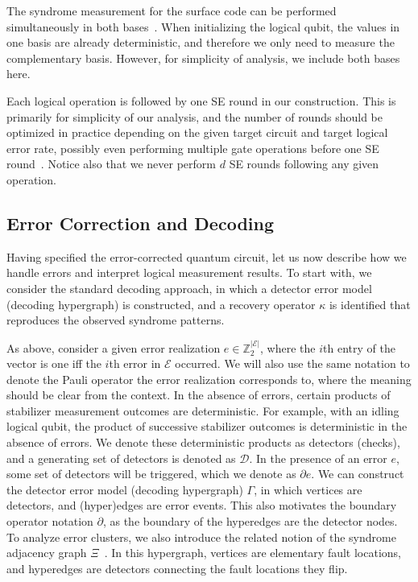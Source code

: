 The syndrome measurement for the surface code can be performed simultaneously in both bases~\cite{fowler2012surface}.
%
When initializing the logical qubit, the values in one basis are already deterministic, and therefore we only need to measure the complementary basis.
%
However, for simplicity of analysis, we include both bases here.

Each logical operation is followed by one SE round in our construction.
%
This is primarily for simplicity of our analysis, and the number of rounds should be optimized in practice depending on the given target circuit and target logical error rate, possibly even performing multiple gate operations before one SE round~\cite{cain2024correlated}.
%
Notice also that we never perform $d$ SE rounds following any given operation.

\subsection{Error Correction and Decoding}
\label{si:decoding}
Having specified the error-corrected quantum circuit, let us now describe how we handle errors and interpret logical measurement results.
%
To start with, we consider the standard decoding approach, in which a detector error model (decoding hypergraph) is constructed, and a recovery operator $\kappa$ is identified that reproduces the observed syndrome patterns.

As above, consider a given error realization $e\in \mathbb{Z}_2^{|\mathcal{E}|}$, where the $i$th entry of the vector is one iff the $i$th error in $\mathcal{E}$ occurred.
%
We will also use the same notation to denote the Pauli operator the error realization corresponds to, where the meaning should be clear from the context.
%
In the absence of errors, certain products of stabilizer measurement outcomes are deterministic.
%
For example, with an idling logical qubit, the product of successive stabilizer outcomes is deterministic in the absence of errors.
%
We denote these deterministic products as detectors (checks), and a generating set of detectors is denoted as $\mathcal{D}$.
%
In the presence of an error $e$, some set of detectors will be triggered, which we denote as $\partial e$.
%
We can construct the detector error model (decoding hypergraph) $\Gamma$, in which vertices are detectors, and (hyper)edges are error events.
%
This also motivates the boundary operator notation $\partial$, as the boundary of the hyperedges are the detector nodes.
%
To analyze error clusters, we also introduce the related notion of the syndrome adjacency graph $\Xi$~\cite{gottesman2013fault}.
%
In this hypergraph, vertices are elementary fault locations, and hyperedges are detectors connecting the fault locations they flip.

